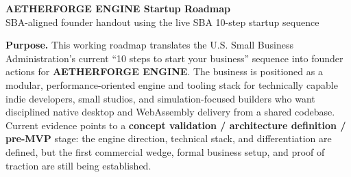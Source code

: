 \documentclass[10pt]{article}
\begin{document}
{\LARGE \textbf{AETHERFORGE ENGINE Startup Roadmap}}\\
{\large SBA-aligned founder handout using the live SBA 10-step startup sequence}

\textbf{Purpose.} This working roadmap translates the U.S. Small Business Administration's current ``10 steps to start your business'' sequence into founder actions for \textbf{AETHERFORGE ENGINE}. The business is positioned as a modular, performance-oriented engine and tooling stack for technically capable indie developers, small studios, and simulation-focused builders who want disciplined native desktop and WebAssembly delivery from a shared codebase. Current evidence points to a \textbf{concept validation / architecture definition / pre-MVP} stage: the engine direction, technical stack, and differentiation are defined, but the first commercial wedge, formal business setup, and proof of traction are still being established.
\end{document}
